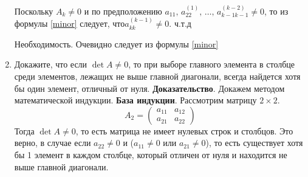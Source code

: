 \documentclass{article}
\begin{document}
\begin{enumerate}
	Поскольку $A_k \neq 0$ и по предположению  $a_{11},\, a_{22}^{(1)},\, \ldots, \, a_{k-1 k-1} ^ {(k-2)} \neq 0$, то из формулы \ref{minor} следует, что$a_{kk}^{(k-1)} \neq 0$. ч.т.д
	
	
	Необходимость. Очевидно следует из формулы \ref{minor}
    \item Докажите, что если $\det A \neq 0$, то при выборе
    главного элемента в столбце среди элементов, лежащих не выше главной диагонали,
    всегда найдется хотя бы один элемент, отличный от нуля.
    \newline
    {\bfseries Доказательство}. 
    Докажем методом математической индукции.
    \newline 
    {\bfseries База индукции}. Рассмотрим матрицу $2 \times 2$. 
    \begin{equation*}
        A_2 = 
      \begin{pmatrix}
        a_{11} & a_{12} \\ 
        a_{21} & a_{22}
      \end{pmatrix}
    \end{equation*}
    Тогда $\det A \neq 0$, то есть матрица не имеет нулевых строк и столбцов. Это верно, в случае
    если $a_{22} \neq 0$ и ($a_{11} \neq 0$ или $a_{21} \neq 0$), то есть существует хотя бы 
    1 элемент в каждом столбце, который отличен от нуля и находится не выше главной диагонали.
    

\end{enumerate}
\end{document}
